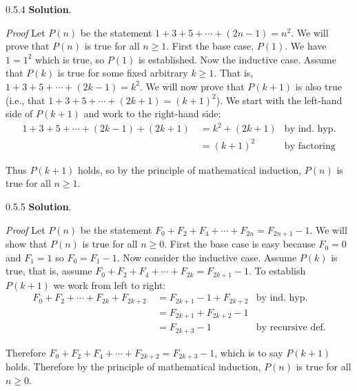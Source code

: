 \documentclass[11pt,]{book}
\makeatletter
\theoremstyle{ptxplainnotitle}
\theoremstyle{ptxplaintitle}
\renewcommand*{\proofname}{Proof}
\renewenvironment{proof}[1][\proofname]{\par
  \pushQED{\qed}%
  \normalfont \topsep6\p@\@plus6\p@\relax
  \trivlist
  \item\relax
    {\itshape
    #1\@addpunct{.}}\hspace\labelsep\ignorespaces
}{%
  \popQED\endtrivlist\@endpefalse
}
\theoremstyle{ptxdefinitionnotitle}
\theoremstyle{ptxdefinitiontitle}
\theoremstyle{ptxdefinitionnotitle}
\theoremstyle{ptxdefinitiontitle}
\theoremstyle{ptxdefinitionnotitle}
\theoremstyle{ptxdefinitiontitle}
\theoremstyle{ptxdefinitiontitlenonumber}
\theoremstyle{ptxdefinitiontitlenonumber}
\numberwithin{equation}{chapter}
\newcommand{\amp}{&}
\makeatother
\begin{document}
\begin{divisionexercise}{0.5.4}
\textbf{Solution}.\quad%
\begin{proof}\hypertarget{proof-7}{}
\hypertarget{p-615}{}%
Let \(P(n)\) be the statement \(1+3 +5 + \cdots + (2n-1) = n^2\). We will prove that \(P(n)\) is true for all \(n \ge 1\). First the base case, \(P(1)\). We have \(1 = 1^2\) which is true, so \(P(1)\) is established. Now the inductive case. Assume that \(P(k)\) is true for some fixed arbitrary \(k \ge 1\). That is, \(1 + 3 + 5 + \cdots + (2k-1) = k^2\). We will now prove that \(P(k+1)\) is also true (i.e., that \(1 + 3 + 5 + \cdots + (2k+1) = (k+1)^2\)). We start with the left-hand side of \(P(k+1)\) and work to the right-hand side:%
\begin{align*}
1 + 3 + 5 + \cdots + (2k-1) + (2k+1) ~ \amp = k^2 + (2k+1) \amp \text{by ind. hyp.}\\
\amp = (k+1)^2 \amp \text{by factoring}
\end{align*}
%
\par
\hypertarget{p-616}{}%
Thus \(P(k+1)\) holds, so by the principle of mathematical induction, \(P(n)\) is true for all \(n \ge 1\).%
\end{proof}
\end{divisionexercise}%
\begin{divisionexercise}{0.5.5}
\textbf{Solution}.\quad%
\begin{proof}\hypertarget{proof-8}{}
\hypertarget{p-618}{}%
Let \(P(n)\) be the statement \(F_0 + F_2 + F_4 + \cdots + F_{2n} = F_{2n+1} - 1\). We will show that \(P(n)\) is true for all \(n \ge 0\). First the base case is easy because \(F_0 = 0\) and \(F_1 = 1\) so \(F_0 = F_1 - 1\). Now consider the inductive case. Assume \(P(k)\) is true, that is, assume \(F_0 + F_2 + F_4 + \cdots + F_{2k} = F_{2k+1} - 1\). To establish \(P(k+1)\) we work from left to right:%
\begin{align*}
F_0 + F_2 + \cdots + F_{2k} + F_{2k+2} ~ \amp = F_{2k+1} - 1 + F_{2k+2} \amp \text{by ind. hyp.}\\
\amp = F_{2k+1} + F_{2k+2} - 1 \amp\\
\amp = F_{2k+3} - 1 \amp \text{by recursive def.}
\end{align*}
%
\par
\hypertarget{p-619}{}%
Therefore \(F_0 + F_2 + F_4 + \cdots + F_{2k+2} = F_{2k+3} - 1\), which is to say \(P(k+1)\) holds. Therefore by the principle of mathematical induction, \(P(n)\) is true for all \(n \ge 0\).%
\end{proof}
\end{divisionexercise}%
\end{document}
